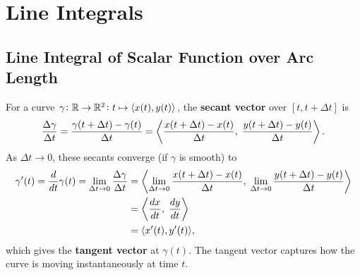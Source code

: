 \documentclass[11pt,openany]{article}
\renewcommand{\emph}[1]{\textbf{#1}}
\begin{document}
\newpage
\section*{Line Integrals}
\subsection*{Line Integral of Scalar Function over Arc Length}

\begin{center}
	\endanimateinline
\end{center}
For a curve $\gamma\colon\mathbb{R}\to\mathbb{R}^2\colon t\mapsto\langle x(t),y(t) \rangle$, the \emph{secant vector} over $[t,t+\Delta t]$ is
\[
\frac{\Delta \gamma}{\Delta t}=\frac{\gamma(t+\Delta t)-\gamma(t)}{\Delta t}
= \left\langle \frac{x(t+\Delta t)-x(t)}{\Delta t},\;\frac{y(t+\Delta t)-y(t)}{\Delta t} \right\rangle.
\]
As $\Delta t \to 0$, these secants converge (if $\gamma$ is smooth) to \begin{align*}
\gamma'(t)=\frac{d}{dt}\gamma(t)= \lim_{\Delta t\to0}
\frac{\Delta\gamma}{\Delta t}&=\left\langle \lim_{\Delta t\to0}\frac{x(t+\Delta t)-x(t)}{\Delta t},\;\lim_{\Delta t\to0}\frac{y(t+\Delta t)-y(t)}{\Delta t} \right\rangle\\
&=\left\langle \frac{dx}{dt},\;\frac{dy}{dt} \right\rangle\\
&=\langle x'(t),y'(t) \rangle,
\end{align*} which gives the \emph{tangent vector} at $\gamma(t)$. The tangent vector captures how the curve is moving instantaneously at time $t$.\par
\end{document}
